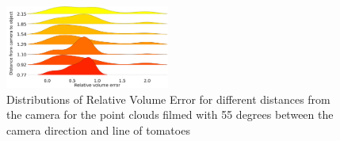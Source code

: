 



\begin{figure}[!htb]
  \centering
      \includegraphics[width=0.48\textwidth]{images/res55.png}
      \caption{Distributions of Relative Volume Error for different distances from the camera for the point clouds filmed with 55 degrees between the camera direction and line of tomatoes}
      \label{fig:55res}
\end{figure}

